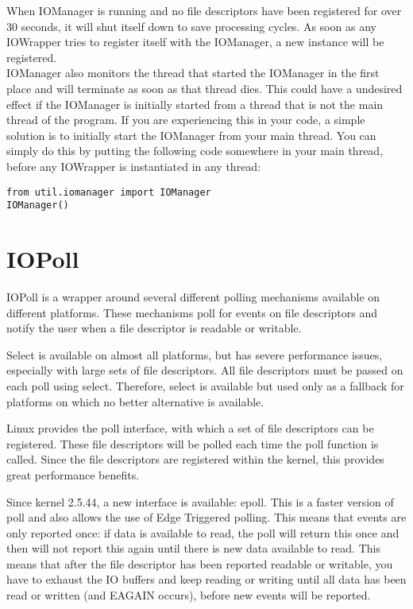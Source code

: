 \documentclass[a4paper, 10pt, oneside]{article}
\begin{document}
When IOManager is running and no file descriptors have been registered for over
30 seconds, it will shut itself down to save processing cycles. As soon as any
IOWrapper tries to register itself with the IOManager, a new instance will be
registered.\\

IOManager also monitors the thread that started the IOManager in the first place
and will terminate as soon as that thread dies. This could have a undesired
effect if the IOManager is initially started from a thread that is not the main
thread of the program. If you are experiencing this in your code, a simple
solution is to initially start the IOManager from your main thread. You can
simply do this by putting the following code somewhere in your main thread,
before any IOWrapper is instantiated in any thread:\\

\begin{lstlisting}
from util.iomanager import IOManager
IOManager()
\end{lstlisting}

\section{IOPoll}
\label{iopoll}
IOPoll is a wrapper around several different polling mechanisms available on
different platforms. These mechanisms poll for events on file descriptors and
notify the user when a file descriptor is readable or writable.

Select is available on almost all platforms, but has severe performance issues,
especially with large sets of file descriptors. All file descriptors must be
passed on each poll using select. Therefore, select is available but used only
as a fallback for platforms on which no better alternative is available.

Linux provides the poll interface, with which a set of file descriptors can be
registered. These file descriptors will be polled each time the poll function is
called. Since the file descriptors are registered within the kernel, this
provides great performance benefits.

Since kernel 2.5.44, a new interface is available: epoll. This is a faster
version of poll and also allows the use of Edge Triggered polling. This means
that events are only reported once: if data is available to read, the poll will
return this once and then will not report this again until there is new data
available to read. This means that after the file descriptor has been reported
readable or writable, you have to exhaust the IO buffers and keep reading or
writing until all data has been read or written (and EAGAIN occurs), before new
events will be reported.
\end{document}
